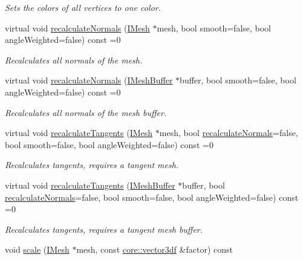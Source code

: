 \begin{DoxyCompactItemize}
\begin{DoxyCompactList}\small\item\em Sets the colors of all vertices to one color. \end{DoxyCompactList}\item 
virtual void \hyperlink{classirr_1_1scene_1_1IMeshManipulator_a8dba16b7eedeac07761c9c1247944429}{recalculate\+Normals} (\hyperlink{classirr_1_1scene_1_1IMesh}{I\+Mesh} $\ast$mesh, bool smooth=false, bool angle\+Weighted=false) const =0
\begin{DoxyCompactList}\small\item\em Recalculates all normals of the mesh. \end{DoxyCompactList}\item 
virtual void \hyperlink{classirr_1_1scene_1_1IMeshManipulator_a94d8390182763e608ca43978b8866d11}{recalculate\+Normals} (\hyperlink{classirr_1_1scene_1_1IMeshBuffer}{I\+Mesh\+Buffer} $\ast$buffer, bool smooth=false, bool angle\+Weighted=false) const =0
\begin{DoxyCompactList}\small\item\em Recalculates all normals of the mesh buffer. \end{DoxyCompactList}\item 
virtual void \hyperlink{classirr_1_1scene_1_1IMeshManipulator_a0ea43e8c4e8489551228b3005d325cd6}{recalculate\+Tangents} (\hyperlink{classirr_1_1scene_1_1IMesh}{I\+Mesh} $\ast$mesh, bool \hyperlink{classirr_1_1scene_1_1IMeshManipulator_a8dba16b7eedeac07761c9c1247944429}{recalculate\+Normals}=false, bool smooth=false, bool angle\+Weighted=false) const =0
\begin{DoxyCompactList}\small\item\em Recalculates tangents, requires a tangent mesh. \end{DoxyCompactList}\item 
virtual void \hyperlink{classirr_1_1scene_1_1IMeshManipulator_a6bea784eb6cf29bdd771dde3903a2758}{recalculate\+Tangents} (\hyperlink{classirr_1_1scene_1_1IMeshBuffer}{I\+Mesh\+Buffer} $\ast$buffer, bool \hyperlink{classirr_1_1scene_1_1IMeshManipulator_a8dba16b7eedeac07761c9c1247944429}{recalculate\+Normals}=false, bool smooth=false, bool angle\+Weighted=false) const =0
\begin{DoxyCompactList}\small\item\em Recalculates tangents, requires a tangent mesh buffer. \end{DoxyCompactList}\item 
void \hyperlink{classirr_1_1scene_1_1IMeshManipulator_abd2a0bdd00605f638f619177e64b1cce}{scale} (\hyperlink{classirr_1_1scene_1_1IMesh}{I\+Mesh} $\ast$mesh, const \hyperlink{namespaceirr_1_1core_a06f169d08b5c429f5575acb7edbad811}{core\+::vector3df} \&factor) const

\end{DoxyCompactItemize}
